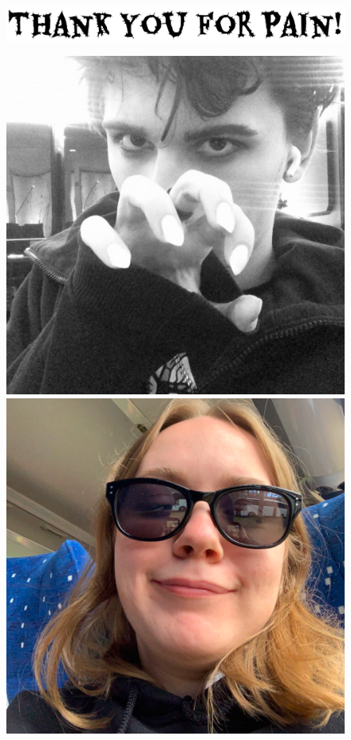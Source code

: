 \begin{center}
    \begin{figure}[H]
        \centering
        \includegraphics[scale=0.2]{img/Untitled}
    \end{figure}
    \begin{figure}[H]
        \centering
        \includegraphics[scale=0.15]{img/my_photo}
        \includegraphics[scale=0.225]{img/dora}
    \end{figure}
\end{center}
